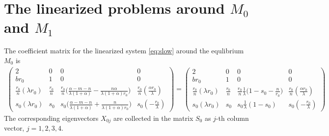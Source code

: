 \documentclass[11pt]{article}
\theoremstyle{remark}
\begin{document}
\section{The linearized problems around $M_0$ and $M_1$}\label{append:lin}
The coefficient matrix for the linearized system \eqref{eq:slow} around the equlibrium $M_0$ is
\begin{align*}
 \begin{pmatrix}
          2 & 0 & 0 & 0 \\
          br_0 & 1 & 0 & 0\\
          \frac{r_0}{n}(\lambda r_0) & \frac{r_0}{n} & \frac{r_0}{n}\Big(\frac{\alpha-m-n}{\lambda(1+\alpha)} - \frac{n\alpha}{\lambda(1+\alpha)r_0}\Big) & \frac{r_0}{n}(\frac{\alpha r_0}{\lambda})\\
          s_0(\lambda r_0) & s_0 & s_0\Big(\frac{\alpha-m-n}{\lambda(1+\alpha)} + \frac{n}{\lambda(1+\alpha)r_0}\Big) & s_0(-\frac{r_0}{\lambda})
         \end{pmatrix}
        =\begin{pmatrix}
          2 & 0 & 0 & 0 \\
          br_0 & 1 & 0 & 0\\
          \frac{r_0}{n}(\lambda r_0) & \frac{r_0}{n} & \frac{r_0}{n}\frac{1}{\lambda}\Big(1-s_0-\frac{n}{r_0}\Big) & \frac{r_0}{n}(\frac{\alpha r_0}{\lambda})\\
          s_0(\lambda r_0) & s_0 & s_0\frac{1}{\lambda}(1-s_0) & s_0(-\frac{r_0}{\lambda})
         \end{pmatrix}
\end{align*}
The corresponding eigenvectors $X_{0j}$ are collected in the matrix $S_0$ as $j$-th column vector, $j=1,2,3,4$.
\end{document}
